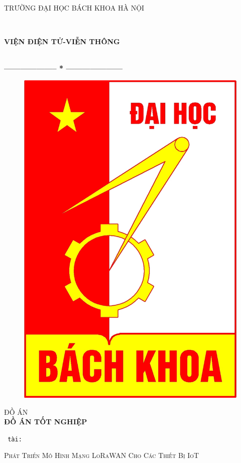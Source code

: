 \documentclass[12pt,a4paper]{article}
\begin{document}
\thispagestyle{empty}
\thisfancypage{
\setlength{\fboxsep}{0pt}
\fbox}{} 
\begin{center}
\begin{large}
TRƯỜNG ĐẠI HỌC BÁCH KHOA HÀ NỘI
\end{large} \\
\begin{large}
\textbf{VIỆN ĐIỆN TỬ-VIỄN THÔNG}
\end{large} \\
\textbf{--------------------  *  ---------------------}\\[0.5cm]
\begin{figure}[h!]
		\centering
		\includegraphics[width=0.15\linewidth]{logobk.pdf}
\end{figure}
 \vspace{0.75cm}

{\fontsize{22pt}{1} \textsc{ĐỒ ÁN}}\\ %
{\fontsize{30pt}{1} \textbf{ĐỒ ÁN TỐT NGHIỆP}}\\[1.5cm] %

\begin{flushleft}
\hspace{0.5cm} \large \texttt{ tài:}
\end{flushleft} 
\begin{LARGE}
\textsc{Phát Triển Mô Hình Mạng LoRaWAN Cho Các Thiết Bị IoT}
\end{LARGE}
\end{center}
\vspace{2cm}
\end{document}
